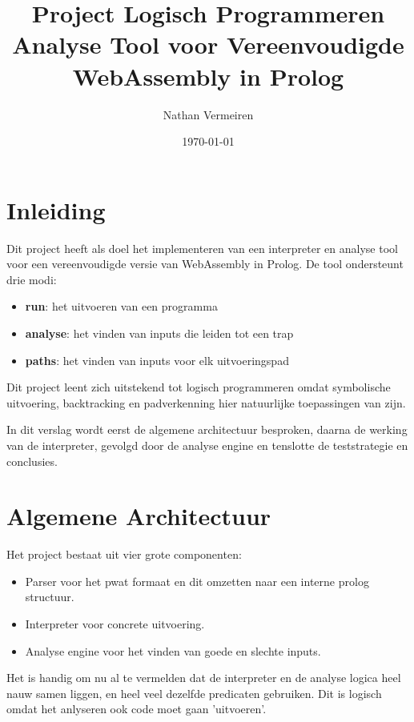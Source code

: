 \documentclass[a4paper,11pt]{article}
\title{Project Logisch Programmeren \\[4pt]
\large Analyse Tool voor Vereenvoudigde WebAssembly in Prolog}
\author{Nathan Vermeiren}
\date{\today}
\begin{document}
\maketitle


\section{Inleiding}

Dit project heeft als doel het implementeren van een interpreter en analyse tool
voor een vereenvoudigde versie van WebAssembly in Prolog. De tool ondersteunt
drie modi:

\begin{itemize}
    \item \textbf{run}: het uitvoeren van een programma
    \item \textbf{analyse}: het vinden van inputs die leiden tot een trap
    \item \textbf{paths}: het vinden van inputs voor elk uitvoeringspad
\end{itemize}

Dit project leent zich uitstekend tot logisch programmeren omdat symbolische
uitvoering, backtracking en padverkenning hier natuurlijke toepassingen van zijn.

In dit verslag wordt eerst de algemene architectuur besproken, daarna de
werking van de interpreter, gevolgd door de analyse engine en tenslotte de
teststrategie en conclusies.


\section{Algemene Architectuur}

Het project bestaat uit vier grote componenten:

\begin{itemize}
    \item Parser voor het pwat formaat en dit omzetten naar een interne prolog structuur.
    \item Interpreter voor concrete uitvoering.
    \item Analyse engine voor het vinden van goede en slechte inputs.
\end{itemize}

Het is handig om nu al te vermelden dat de interpreter en de analyse logica heel nauw samen liggen, en heel veel dezelfde predicaten gebruiken.
Dit is logisch omdat het anlyseren ook code moet gaan 'uitvoeren'.
\end{document}
